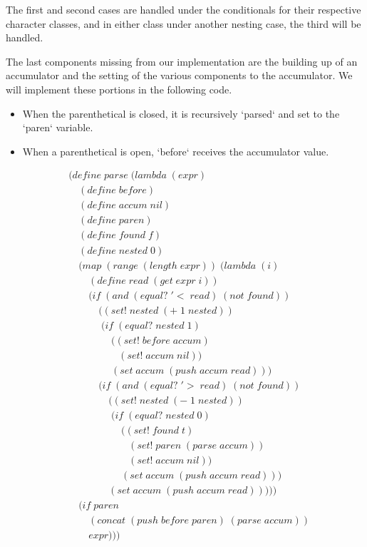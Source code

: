 The first and second cases are handled under the conditionals for their respective 
character classes, and in either class under another nesting case, the third will be 
handled.

The last components missing from our implementation are the building up of an 
accumulator and the setting of the various components to the accumulator. We will 
implement these portions in the following code.

\begin{itemize}
  \item When the parenthetical is closed, it is recursively `parsed` and set to the `paren` variable.
  \item When a parenthetical is open, `before` receives the accumulator value.
\end{itemize}

\begin{align*}
& (define \; parse \; (lambda \; (expr) \; 
\\& \quad (define \; before)
\\& \quad (define \; accum \; nil)
\\& \quad (define \; paren)
\\& \quad (define \; found \; f)
\\& \quad (define \; nested \; 0)
\\& \quad (map \; (range \; (length \; expr)) \; (lambda \; (i)
\\& \qquad (define \; read \; (get \; expr \; i))
\\& \qquad (if \; (and \; (equal? \; '< \; read) \; (not \; found))
\\& \qquad \quad ((set! \; nested \; (+ \; 1 \; nested))
\\& \qquad \quad \; (if \; (equal? \; nested \; 1)
\\& \qquad \qquad \; ((set! \; before \; accum)
\\& \qquad \qquad \quad (set! \; accum \; nil))
\\& \qquad \qquad \; (set \; accum \; (push \; accum \; read)))
\\& \qquad \quad (if \; (and \; (equal? \; '> \; read) \; (not \; found))
\\& \qquad \qquad ((set! \; nested \; (- \; 1 \; nested))
\\& \qquad \qquad \; (if \; (equal? \; nested \; 0)
\\& \qquad \qquad \quad \; ((set! \; found \; t)
\\& \qquad \qquad \qquad (set! \; paren \; (parse \; accum))
\\& \qquad \qquad \qquad (set! \; accum \; nil))
\\& \qquad \qquad \quad \; (set \; accum \; (push \; accum \; read)))
\\& \qquad \qquad (set \; accum \; (push \; accum \; read)))))
\\& \quad (if \; paren
\\& \qquad (concat \; (push \; before \; paren) \; (parse \; accum))
\\& \qquad expr)))
\end{align*}

